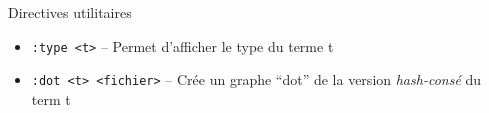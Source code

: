 \begin{frame}{Directives utilitaires}

  \begin{itemize}
  \item \texttt{:type <t>} -- Permet d'afficher le type du terme t
  \bigskip

  \item \texttt{:dot <t> <fichier>} -- Crée un graphe ``dot'' de la version \emph{hash-consé} du term t
  \end{itemize}

\end{frame}
